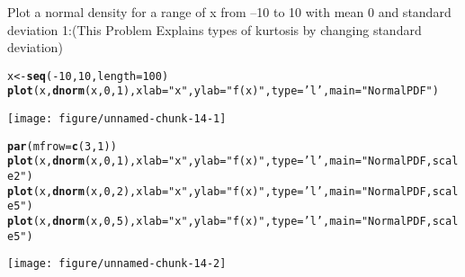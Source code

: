 \documentclass{article}\usepackage[]{graphicx}\usepackage[]{xcolor}
\makeatletter
\def\maxwidth{ %
  \ifdim\Gin@nat@width>\linewidth
    \linewidth
  \else
    \Gin@nat@width
  \fi
}
\newcommand{\hlnum}[1]{\textcolor[rgb]{0.686,0.059,0.569}{#1}}%
\newcommand{\hlsng}[1]{\textcolor[rgb]{0.192,0.494,0.8}{#1}}%
\newcommand{\hlopt}[1]{\textcolor[rgb]{0,0,0}{#1}}%
\newcommand{\hldef}[1]{\textcolor[rgb]{0.345,0.345,0.345}{#1}}%
\newcommand{\hlkwb}[1]{\textcolor[rgb]{0.69,0.353,0.396}{#1}}%
\newcommand{\hlkwc}[1]{\textcolor[rgb]{0.333,0.667,0.333}{#1}}%
\newcommand{\hlkwd}[1]{\textcolor[rgb]{0.737,0.353,0.396}{\textbf{#1}}}%
\newenvironment{kframe}{%
 \def\at@end@of@kframe{}%
 \ifinner\ifhmode%
  \def\at@end@of@kframe{\end{minipage}}%
  \begin{minipage}{\columnwidth}%
 \fi\fi%
 \def\FrameCommand##1{\hskip\@totalleftmargin \hskip-\fboxsep
 \colorbox{shadecolor}{##1}\hskip-\fboxsep
     \hskip-\linewidth \hskip-\@totalleftmargin \hskip\columnwidth}%
 \MakeFramed {\advance\hsize-\width
   \@totalleftmargin\z@ \linewidth\hsize
   \@setminipage}}%
 {\par\unskip\endMakeFramed%
 \at@end@of@kframe}
\newenvironment{knitrout}{}{} %
\makeatother
\begin{document}
Plot a normal density for a range of x from –10 to 10 with mean 0 and standard deviation 1:(This Problem Explains types of kurtosis by changing standard deviation)
\begin{knitrout}
\color{fgcolor}\begin{kframe}
\begin{alltt}
\hldef{x}\hlkwb{<-}\hlkwd{seq}\hldef{(}\hlopt{-}\hlnum{10}\hldef{,}\hlnum{10}\hldef{,}\hlkwc{length}\hldef{=}\hlnum{100}\hldef{)}
\hlkwd{plot}\hldef{(x,}\hlkwd{dnorm}\hldef{(x,}\hlnum{0}\hldef{,}\hlnum{1}\hldef{),}\hlkwc{xlab}\hldef{=}\hlsng{"x"}\hldef{,} \hlkwc{ylab}\hldef{=}\hlsng{"f(x)"}\hldef{,} \hlkwc{type}\hldef{=}\hlsng{'l'}\hldef{,} \hlkwc{main}\hldef{=}\hlsng{"Normal PDF"}\hldef{)}
\end{alltt}
\end{kframe}
\texttt{[image: figure/unnamed-chunk-14-1]} 
\begin{kframe}\begin{alltt}
\hlkwd{par}\hldef{(}\hlkwc{mfrow}\hldef{=}\hlkwd{c}\hldef{(}\hlnum{3}\hldef{,}\hlnum{1}\hldef{))}
\hlkwd{plot}\hldef{(x,}\hlkwd{dnorm}\hldef{(x,}\hlnum{0}\hldef{,}\hlnum{1}\hldef{),}\hlkwc{xlab}\hldef{=}\hlsng{"x"}\hldef{,}\hlkwc{ylab}\hldef{=}\hlsng{"f(x)"}\hldef{,} \hlkwc{type}\hldef{=}\hlsng{'l'}\hldef{,} \hlkwc{main}\hldef{=}\hlsng{"Normal PDF,scale 2"}\hldef{)}
\hlkwd{plot}\hldef{(x,}\hlkwd{dnorm}\hldef{(x,}\hlnum{0}\hldef{,}\hlnum{2}\hldef{),}\hlkwc{xlab}\hldef{=}\hlsng{"x"}\hldef{,}\hlkwc{ylab}\hldef{=}\hlsng{"f(x)"}\hldef{,} \hlkwc{type}\hldef{=}\hlsng{'l'}\hldef{,}\hlkwc{main}\hldef{=}\hlsng{"Normal PDF, scale 5"}\hldef{)}
\hlkwd{plot}\hldef{(x,}\hlkwd{dnorm}\hldef{(x,}\hlnum{0}\hldef{,}\hlnum{5}\hldef{),}\hlkwc{xlab}\hldef{=}\hlsng{"x"}\hldef{,}\hlkwc{ylab}\hldef{=}\hlsng{"f(x)"}\hldef{,} \hlkwc{type}\hldef{=}\hlsng{'l'}\hldef{,}\hlkwc{main}\hldef{=}\hlsng{"Normal PDF, scale 5"}\hldef{)}
\end{alltt}
\end{kframe}
\texttt{[image: figure/unnamed-chunk-14-2]} 
\end{knitrout}
\end{document}
